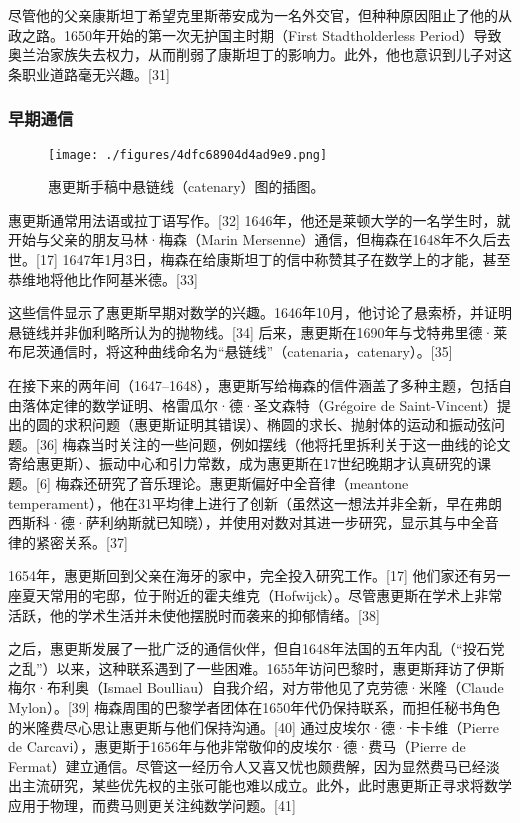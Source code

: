尽管他的父亲康斯坦丁希望克里斯蒂安成为一名外交官，但种种原因阻止了他的从政之路。1650年开始的第一次无护国主时期（First Stadtholderless Period）导致奥兰治家族失去权力，从而削弱了康斯坦丁的影响力。此外，他也意识到儿子对这条职业道路毫无兴趣。[31]
\subsubsection{早期通信}
\begin{figure}[ht]
\centering
\texttt{[image: ./figures/4dfc68904d4ad9e9.png]}
\caption{惠更斯手稿中悬链线（catenary）图的插图。} \label{fig_HGS_3}
\end{figure}
惠更斯通常用法语或拉丁语写作。[32] 1646年，他还是莱顿大学的一名学生时，就开始与父亲的朋友马林·梅森（Marin Mersenne）通信，但梅森在1648年不久后去世。[17] 1647年1月3日，梅森在给康斯坦丁的信中称赞其子在数学上的才能，甚至恭维地将他比作阿基米德。[33]

这些信件显示了惠更斯早期对数学的兴趣。1646年10月，他讨论了悬索桥，并证明悬链线并非伽利略所认为的抛物线。[34] 后来，惠更斯在1690年与戈特弗里德·莱布尼茨通信时，将这种曲线命名为“悬链线”（catenaria，catenary）。[35]

在接下来的两年间（1647–1648），惠更斯写给梅森的信件涵盖了多种主题，包括自由落体定律的数学证明、格雷瓜尔·德·圣文森特（Grégoire de Saint-Vincent）提出的圆的求积问题（惠更斯证明其错误）、椭圆的求长、抛射体的运动和振动弦问题。[36] 梅森当时关注的一些问题，例如摆线（他将托里拆利关于这一曲线的论文寄给惠更斯）、振动中心和引力常数，成为惠更斯在17世纪晚期才认真研究的课题。[6] 梅森还研究了音乐理论。惠更斯偏好中全音律（meantone temperament），他在31平均律上进行了创新（虽然这一想法并非全新，早在弗朗西斯科·德·萨利纳斯就已知晓），并使用对数对其进一步研究，显示其与中全音律的紧密关系。[37]

1654年，惠更斯回到父亲在海牙的家中，完全投入研究工作。[17] 他们家还有另一座夏天常用的宅邸，位于附近的霍夫维克（Hofwijck）。尽管惠更斯在学术上非常活跃，他的学术生活并未使他摆脱时而袭来的抑郁情绪。[38]

之后，惠更斯发展了一批广泛的通信伙伴，但自1648年法国的五年内乱（“投石党之乱”）以来，这种联系遇到了一些困难。1655年访问巴黎时，惠更斯拜访了伊斯梅尔·布利奥（Ismael Boulliau）自我介绍，对方带他见了克劳德·米隆（Claude Mylon）。[39] 梅森周围的巴黎学者团体在1650年代仍保持联系，而担任秘书角色的米隆费尽心思让惠更斯与他们保持沟通。[40] 通过皮埃尔·德·卡卡维（Pierre de Carcavi），惠更斯于1656年与他非常敬仰的皮埃尔·德·费马（Pierre de Fermat）建立通信。尽管这一经历令人又喜又忧也颇费解，因为显然费马已经淡出主流研究，某些优先权的主张可能也难以成立。此外，此时惠更斯正寻求将数学应用于物理，而费马则更关注纯数学问题。[41]
